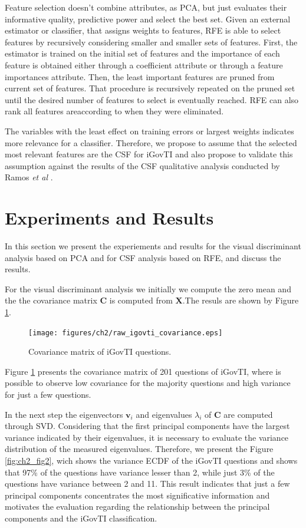 Feature selection doesn't combine attributes, as PCA, but just evaluates their informative quality, predictive power and select the best set. Given an external estimator or classifier, that assigns weights to features, RFE is able to select features by recursively considering smaller and smaller sets of features. First, the estimator is trained on the initial set of features and the importance of each feature is obtained either through a coefficient attribute or through a feature importances attribute. Then, the least important features are pruned from current set of features. That procedure is recursively repeated on the pruned set until the desired number of features to select is eventually reached. RFE can also rank all features areaccording to when they were eliminated. 

The variables with the least effect on training errors or largest weights indicates more relevance for a classifier. Therefore, we propose to assume that the selected most relevant features are the CSF for iGovTI and also propose to validate this assumption against the results of the CSF qualitative analysis conducted by Ramos \emph{et al} \cite{ramos2016information}.


\section{Experiments and Results}
\label{sec:b_experimentalresults}

In this section we present the experiements and results for the visual discriminant analysis based on PCA and for CSF analysis based on RFE, and discuss the results.

For the visual discriminant analysis we initially we compute the zero mean and the the covariance matrix $\mathbf{C}$ is computed from $\mathbf{X}$.The resuls are shown by Figure \ref{fig:ch2_fig1}.
 
\begin{figure}[h!]
     \centering 
     \texttt{[image: figures/ch2/raw\_igovti\_covariance.eps]}
     \caption{Covariance matrix of iGovTI questions.}
     \label{fig:ch2_fig1}
\end{figure}

Figure \ref{fig:ch2_fig1} presents the covariance matrix of 201 questions of iGovTI, where is possible to observe low covariance for the majority questions and high variance for just a few questions. 

In the next step the eigenvectors $\mathbf{v}_i$ and eigenvalues $\lambda_i$ of $\mathbf{C}$ are computed through SVD. Considering that the first principal components have the largest variance indicated by their eigenvalues, it is necessary to evaluate the variance distribution of the measured eigenvalues. Therefore, we present the Figure \ref{fig:ch2_fig2}, wich shows the variance ECDF of the iGovTI questions and shows that 97\% of the questions have variance lesser than 2, while just 3\% of the questions have variance between 2 and 11. This result indicates that just a few principal components concentrates the most significative information and motivates the evaluation regarding the relationship between the principal components and the iGovTI classification.

